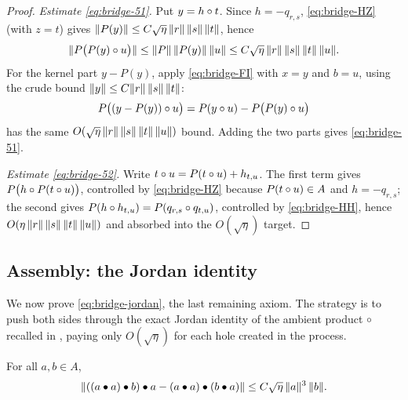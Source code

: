 \begin{proof}
\emph{Estimate \eqref{eq:bridge-51}.} Put $y=h\circ t$. Since $h=-q_{r,s}$,
\eqref{eq:bridge-HZ} (with $z=t$) gives
$\lVert P(y) \rVert\le C\sqrt\eta\,\lVert r \rVert\,\lVert s \rVert\,\lVert t \rVert$, hence
\[
  \lVert P\big(P(y)\circ u\big) \rVert\le\lVert P \rVert\,\lVert P(y) \rVert\,\lVert u \rVert
   \le C\sqrt\eta\,\lVert r \rVert\,\lVert s \rVert\,\lVert t \rVert\,\lVert u \rVert.
\]
For the kernel part $y-P(y)$, apply \eqref{eq:bridge-FI} with $x=y$ and $b=u$,
using the crude bound $\lVert y \rVert\le C\lVert r \rVert\,\lVert s \rVert\,\lVert t \rVert$:
\[
  P\big((y-P(y))\circ u\big)=P(y\circ u)-P\big(P(y)\circ u\big)
\]
has the same $O(\sqrt\eta\,\lVert r \rVert\,\lVert s \rVert\,\lVert t \rVert\,\lVert u \rVert)$ bound. Adding
the two parts gives \eqref{eq:bridge-51}.

\emph{Estimate \eqref{eq:bridge-52}.} Write $t\circ u=P(t\circ u)+h_{t,u}$. The first
term gives $P\big(h\circ P(t\circ u)\big)$, controlled by \eqref{eq:bridge-HZ}
because $P(t\circ u)\in A$ and $h=-q_{r,s}$; the second gives
$P(h\circ h_{t,u})=P(q_{r,s}\circ q_{t,u})$, controlled by \eqref{eq:bridge-HH},
hence $O(\eta\,\lVert r \rVert\,\lVert s \rVert\,\lVert t \rVert\,\lVert u \rVert)$ and absorbed into the
$O(\sqrt\eta)$ target.
\end{proof}

\subsection*{Assembly: the Jordan identity}

We now prove \eqref{eq:bridge-jordan}, the last remaining axiom. The strategy is
to push both sides through the exact Jordan identity of the ambient product
$\circ$ recalled in , paying only $O(\sqrt\eta)$ for each
hole created in the process.

\begin{proposition}\label{prop:bridge-jordan}
For all $a,b\in A$,
\[
  \lVert ((a\bullet a)\bullet b)\bullet a-(a\bullet a)\bullet(b\bullet a) \rVert
   \le C\sqrt\eta\,\lVert a \rVert^3\,\lVert b \rVert.
\]
\end{proposition}

